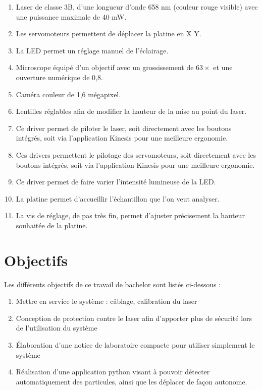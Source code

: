 \begin{enumerate}
    \item Laser de classe 3B, d'une longueur d'onde 658 nm (couleur rouge visible) avec une puissance maximale de 40 mW.
    \item Les servomoteurs permettent de déplacer la platine en X Y.
    \item La LED permet un réglage manuel de l'éclairage.
    \item Microscope équipé d'un objectif avec un grossissement de $63\times$ et une ouverture numérique de 0,8.
    \item Caméra couleur de 1,6 mégapixel.
    \item Lentilles réglables afin de modifier la hauteur de la mise au point du laser.
    \item Ce driver permet de piloter le laser, soit directement avec les boutons intégrés, soit via l'application Kinesis \cite{kinesisSoftware} pour une meilleure ergonomie.
    \item Ces drivers permettent le pilotage des servomoteurs, soit directement avec les boutons intégrés, soit via l'application Kinesis pour une meilleure ergonomie.
    \item Ce driver permet de faire varier l'intensité lumineuse de la LED.
    \item La platine permet d'accueillir l'échantillon que l'on veut analyser.
    \item La vis de réglage, de pas très fin, permet d'ajuster précisement la hauteur souhaitée de la platine.
\end{enumerate}

\section{Objectifs}

Les différents objectifs de ce travail de bachelor sont listés ci-dessous :
\begin{enumerate}
    \item Mettre en service le système : câblage, calibration du laser
    \item Conception de protection contre le laser afin d'apporter plus de sécurité lors de l'utilisation du système
    \item Élaboration d'une notice de laboratoire compacte pour utiliser simplement le système
    \item Réalisation d'une application python visant à pouvoir détecter automatiquement des particules, ainsi que les déplacer de façon autonome.
\end{enumerate}

